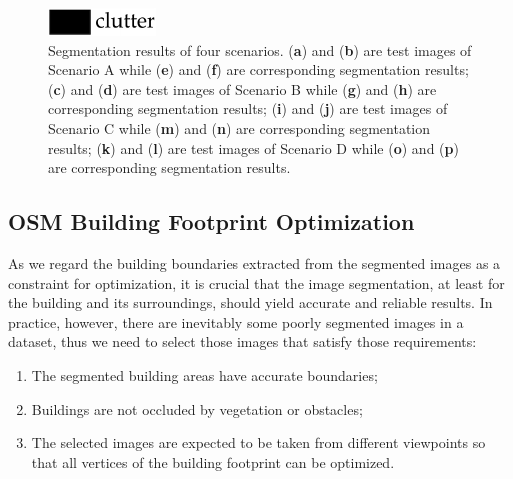 \begin{figure}[H]
      \protect\includegraphics[scale=1]{fig7.pdf}
       \caption{Segmentation results of four scenarios. (\textbf{a}) and (\textbf{b}) are test images of Scenario A while (\textbf{e}) and (\textbf{f}) are corresponding segmentation results; (\textbf{c}) and (\textbf{d}) are test images of Scenario B while (\textbf{g}) and (\textbf{h}) are corresponding segmentation results; (\textbf{i}) and (\textbf{j}) are test images of Scenario C while (\textbf{m}) and (\textbf{n}) are corresponding segmentation results; (\textbf{k}) and (\textbf{l}) are test images of Scenario D while (\textbf{o}) and (\textbf{p}) are corresponding segmentation results.}       
       \label{fig:seg}
\end{figure}

\subsection{OSM Building Footprint Optimization}
As we regard the building boundaries extracted from the segmented images as a constraint for optimization, it is crucial that the image segmentation, at least for the building and its surroundings, should yield accurate and reliable results. In practice, however, there are inevitably some poorly segmented images in a dataset, thus we need to select those images that satisfy those requirements: 
\begin{enumerate}[leftmargin=*,labelsep=5.5mm]
\item The segmented building areas have accurate boundaries; 
\item Buildings are not occluded by vegetation or obstacles;
\item The selected images are expected to be taken from different viewpoints so that all vertices of the building footprint can be optimized.
\end{enumerate}
  


